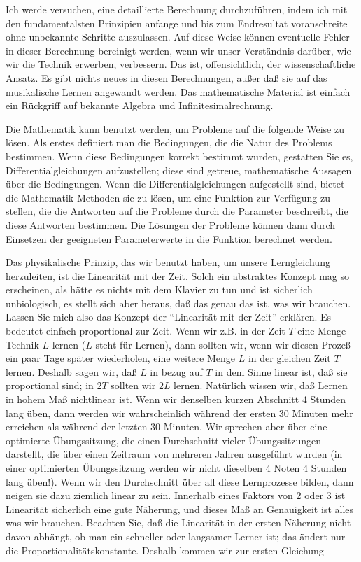 Ich werde versuchen, eine detaillierte Berechnung durchzuführen, indem ich mit den fundamentalsten Prinzipien anfange und bis zum Endresultat voranschreite ohne unbekannte Schritte auszulassen.
Auf diese Weise können eventuelle Fehler in dieser Berechnung bereinigt werden, wenn wir unser Verständnis darüber, wie wir die Technik erwerben, verbessern.
Das ist, offensichtlich, der wissenschaftliche Ansatz.
Es gibt nichts neues in diesen Berechnungen, außer daß sie auf das musikalische Lernen angewandt werden.
Das mathematische Material ist einfach ein Rückgriff auf bekannte Algebra und Infinitesimalrechnung.

Die Mathematik kann benutzt werden, um Probleme auf die folgende Weise zu lösen.
Als erstes definiert man die Bedingungen, die die Natur des Problems bestimmen.
Wenn diese Bedingungen korrekt bestimmt wurden, gestatten Sie es, Differentialgleichungen aufzustellen; diese sind getreue, mathematische Aussagen über die Bedingungen.
Wenn die Differentialgleichungen aufgestellt sind, bietet die Mathematik Methoden sie zu lösen, um eine Funktion zur Verfügung zu stellen, die die Antworten auf die Probleme durch die Parameter beschreibt, die diese Antworten bestimmen.
Die Lösungen der Probleme können dann durch Einsetzen der geeigneten Parameterwerte in die Funktion berechnet werden.

Das physikalische Prinzip, das wir benutzt haben, um unsere Lerngleichung herzuleiten, ist die Linearität mit der Zeit.
Solch ein abstraktes Konzept mag so erscheinen, als hätte es nichts mit dem Klavier zu tun und ist sicherlich unbiologisch, es stellt sich aber heraus, daß das genau das ist, was wir brauchen.
Lassen Sie mich also das Konzept der \enquote{Linearität mit der Zeit} erklären.
Es bedeutet einfach proportional zur Zeit.
Wenn wir z.B. in der Zeit $T$ eine Menge Technik $L$ lernen ($L$ steht für Lernen), dann sollten wir, wenn wir diesen Prozeß ein paar Tage später wiederholen, eine weitere Menge $L$ in der gleichen Zeit $T$ lernen.
Deshalb sagen wir, daß $L$ in bezug auf $T$ in dem Sinne linear ist, daß sie proportional sind; in $2T$ sollten wir $2L$ lernen.
Natürlich wissen wir, daß Lernen in hohem Maß nichtlinear ist.
Wenn wir denselben kurzen Abschnitt 4 Stunden lang üben, dann werden wir wahrscheinlich während der ersten 30 Minuten mehr erreichen als während der letzten 30 Minuten.
Wir sprechen aber über eine optimierte Übungssitzung, die einen Durchschnitt vieler Übungssitzungen darstellt, die über einen Zeitraum von mehreren Jahren ausgeführt wurden (in einer optimierten Übungssitzung werden wir nicht dieselben 4 Noten 4 Stunden lang üben!).
Wenn wir den Durchschnitt über all diese Lernprozesse bilden, dann neigen sie dazu ziemlich linear zu sein.
Innerhalb eines Faktors von 2 oder 3 ist Linearität sicherlich eine gute Näherung, und dieses Maß an Genauigkeit ist alles was wir brauchen.
Beachten Sie, daß die Linearität in der ersten Näherung nicht davon abhängt, ob man ein schneller oder langsamer Lerner ist; das ändert nur die Proportionalitätskonstante.
Deshalb kommen wir zur ersten Gleichung

